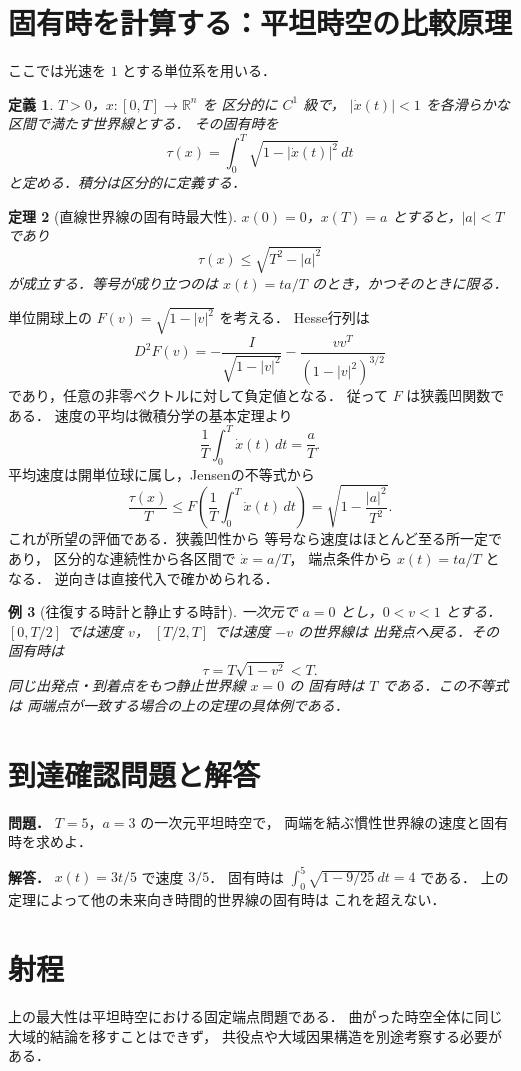 \documentclass[a5paper,10pt,onecolumn]{jsarticle}
\makeatletter
\theoremstyle{mathnotetheorem}
\newtheorem{theorem}{定理}[section]
\newtheorem{definition}[theorem]{定義}
\newtheorem{example}[theorem]{例}
\renewcommand{\proofname}{証明}
\renewenvironment{proof}[1][\proofname]{%
  \par\pushQED{\qed}\normalfont\topsep4\p@\@plus2\p@\relax
  \trivlist\item[\hskip\labelsep\bfseries #1]\ignorespaces
}{\popQED\endtrivlist\@endpefalse}
\makeatother
\begin{document}
\section{固有時を計算する：平坦時空の比較原理}
ここでは光速を $1$ とする単位系を用いる．
\begin{definition}
$T>0$，$x:[0,T]\to\mathbb R^n$ を
区分的に $C^1$ 級で，
$|\dot x(t)|<1$ を各滑らかな区間で満たす世界線とする．
その\emph{固有時}を
\[
 \tau(x)=\int_0^T\sqrt{1-|\dot x(t)|^2}\,dt
\]
と定める．積分は区分的に定義する．
\end{definition}
\begin{theorem}[直線世界線の固有時最大性]
$x(0)=0$，$x(T)=a$ とすると，$|a|<T$ であり
\[
 \tau(x)\le\sqrt{T^2-|a|^2}
\]
が成立する．等号が成り立つのは
$x(t)=ta/T$ のとき，かつそのときに限る．
\end{theorem}
\begin{proof}
単位開球上の $F(v)=\sqrt{1-|v|^2}$ を考える．
Hesse行列は
\[
 D^2F(v)=-\frac{I}{\sqrt{1-|v|^2}}
 -\frac{vv^T}{(1-|v|^2)^{3/2}}
\]
であり，任意の非零ベクトルに対して負定値となる．
従って $F$ は狭義凹関数である．
速度の平均は微積分学の基本定理より
\[
 \frac1T\int_0^T\dot x(t)\,dt=\frac aT.
\]
平均速度は開単位球に属し，Jensenの不等式から
\[
 \frac{\tau(x)}T
 \le F\left(\frac1T\int_0^T\dot x(t)\,dt\right)
 =\sqrt{1-\frac{|a|^2}{T^2}}.
\]
これが所望の評価である．狭義凹性から
等号なら速度はほとんど至る所一定であり，
区分的な連続性から各区間で $\dot x=a/T$，
端点条件から $x(t)=ta/T$ となる．
逆向きは直接代入で確かめられる．
\end{proof}
\begin{example}[往復する時計と静止する時計]
一次元で $a=0$ とし，$0<v<1$ とする．
$[0,T/2]$ では速度 $v$，
$[T/2,T]$ では速度 $-v$ の世界線は
出発点へ戻る．その固有時は
\[
 \tau=T\sqrt{1-v^2}<T.
\]
同じ出発点・到着点をもつ静止世界線 $x=0$ の
固有時は $T$ である．この不等式は
両端点が一致する場合の上の定理の具体例である．
\end{example}
\section*{到達確認問題と解答}
\noindent\textbf{問題．}
$T=5$，$a=3$ の一次元平坦時空で，
両端を結ぶ慣性世界線の速度と固有時を求めよ．

\medskip\noindent\textbf{解答．}
$x(t)=3t/5$ で速度 $3/5$．
固有時は
$\int_0^5\sqrt{1-9/25}\,dt=4$ である．
上の定理によって他の未来向き時間的世界線の固有時は
これを超えない．
\section*{射程}
上の最大性は平坦時空における固定端点問題である．
曲がった時空全体に同じ大域的結論を移すことはできず，
共役点や大域因果構造を別途考察する必要がある．
\end{document}
